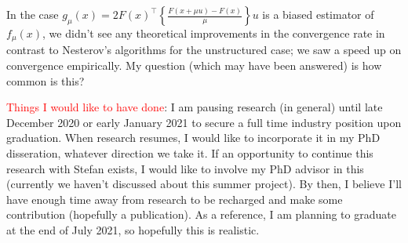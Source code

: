 \documentclass{article}
\begin{document}
In the case $g_{\mu}(x) = 2F(x)^\top \left\{\frac{F(x+ \mu u) - F(x)}{\mu}\right\}u$ is a biased estimator of $f_{\mu}(x)$, we didn't see any theoretical improvements in the convergence rate in contrast to Nesterov's algorithms for the unstructured case; we saw a speed up on convergence empirically. My question (which may have been answered) is how common is this? \newline 

\textcolor{red}{Things I would like to have done}: I am pausing research (in general) until late December 2020 or early January 2021 to secure a full time industry position upon graduation. When research resumes, I would like to incorporate it in my PhD disseration, whatever direction we take it. If an opportunity to continue this research with Stefan exists, I would like to involve my PhD advisor in this (currently we haven't discussed about this summer project). By then, I believe I'll have enough time away from research to be recharged and make some contribution (hopefully a publication). As a reference, I am planning to graduate at the end of July 2021, so hopefully this is realistic. 


 
\end{document}
